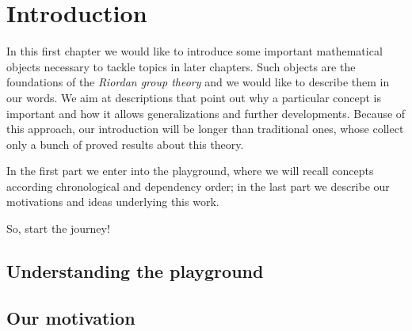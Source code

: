 
\chapter{Introduction}

In this first chapter we would like to introduce some important mathematical
objects necessary to tackle topics in later chapters. Such objects are the
foundations of the \emph{Riordan group theory} and we would like to describe
them in our words.  We aim at descriptions that point out why a particular
concept is important and how it allows generalizations and further
developments. Because of this approach, our introduction will be longer than
traditional ones, whose collect only a bunch of proved results about this
theory.

In the first part we enter into the playground, where we will recall concepts
according chronological and dependency order; in the last part we describe our
motivations and ideas underlying this work. 

So, start the journey!

\section{Understanding the playground}









\section{Our motivation}

